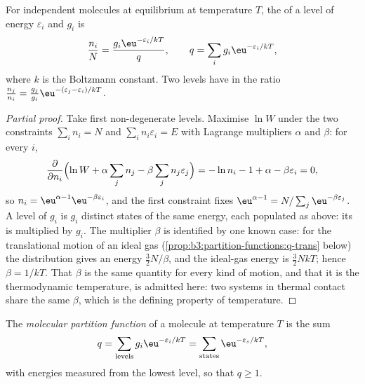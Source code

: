 \begin{theorem}\label{thm:b3:partition-functions:boltzmann}
For independent molecules at equilibrium at temperature $T$, the  of a
level of energy $\varepsilon_i$ and  $g_i$ is
\[
  \frac{n_i}{N} = \frac{g_i\eu^{-\varepsilon_i/kT}}{q},
  \qquad q = \sum_i g_i\eu^{-\varepsilon_i/kT},
\]
where $k$ is the Boltzmann constant. Two levels have  in the ratio
$\frac{n_j}{n_i} = \frac{g_j}{g_i}\eu^{-(\varepsilon_j - \varepsilon_i)/kT}$.
\end{theorem}

\begin{proof}[Partial proof]
Take first non-degenerate levels. Maximise $\ln W$ under the two constraints
$\sum_in_i = N$ and $\sum_in_i\varepsilon_i = E$ with Lagrange multipliers $\alpha$ and $\beta$:
for every $i$,
\[
  \frac{\partial}{\partial n_i}\Bigl(\ln W + \alpha\sum_jn_j - \beta\sum_jn_j\varepsilon_j\Bigr)
  = -\ln n_i - 1 + \alpha - \beta\varepsilon_i = 0,
\]
so $n_i = \eu^{\alpha - 1}\eu^{-\beta\varepsilon_i}$, and the first constraint fixes $\eu^{\alpha - 1}
= N/\sum_j\eu^{-\beta\varepsilon_j}$. A level of  $g_i$ is $g_i$ distinct states of
the same energy, each populated as above: its  is multiplied by
$g_i$. The multiplier $\beta$ is identified by one known case: for the
translational motion of an ideal gas (\cref{prop:b3:partition-functions:q-trans}
below) the distribution gives an energy $\frac32N/\beta$, and the ideal-gas
energy is $\frac32NkT$; hence $\beta = 1/kT$. That $\beta$ is the same quantity for every
kind of motion, and that it is the thermodynamic temperature, is admitted
here: two systems in thermal contact share the same $\beta$, which is the defining
property of temperature.
\end{proof}

\begin{definition}\label{def:b3:partition-functions:partition-function}
The \emph{molecular partition function} of a
molecule at temperature $T$ is the sum
\[
  q = \sum_{\text{levels}}g_i\eu^{-\varepsilon_i/kT} = \sum_{\text{states}}\eu^{-\varepsilon_s/kT},
\]
with energies measured from the lowest level, so that $q \ge 1$.
\end{definition}

